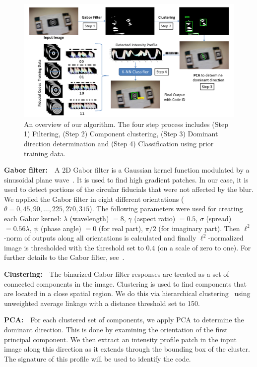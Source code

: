 \begin{figure}[ht!]
  \centering
  \includegraphics[width=0.8\linewidth]{figures/fiducial/overall_flow.pdf}
  \caption[Overall Workflow]{An overview of our algorithm.
    The four step process includes (Step 1) Filtering,
    (Step 2) Component clustering, (Step 3) Dominant direction determination
    and (Step 4) Classification using prior training data.}
  \label{fig:overall_flow}
\end{figure}

\textbf{Gabor filter:}~~A 2D Gabor filter is a Gaussian kernel function
modulated by a sinusoidal plane wave~\cite{Kruizinga:2002}. It is used to find
high gradient patches. In our case, it is used to detect portions
of the circular fiducials that were not affected by the blur.
We applied the Gabor filter in eight
different orientations ($\theta = 0, 45, 90, \ldots, 225, 270, 315$).  The
following parameters were used for creating each Gabor kernel: $\lambda$ (wavelength) $= 8$, $\gamma$
(aspect ratio) $= 0.5$, $\sigma$ (spread) $= 0.56\lambda$, $\psi$
(phase angle) $= 0$ (for real part), $\pi/2$ (for imaginary part).
Then $\ell^2$-norm of outputs along all orientations is calculated and finally
$\ell^2$-normalized image is thresholded with the threshold set to $0.4$ (on
a scale of zero to one).  For further details to the Gabor filter,
see~\cite{Kruizinga:2002}.

\textbf{Clustering:}~~The binarized Gabor filter responses are
treated as a set of connected components in the image.   Clustering
is used to find components that are located in a close spatial region.  We do
this via hierarchical clustering~\cite{ALGLIB} using unweighted
average linkage with a distance threshold set to 150.

\textbf{PCA:}~~For each clustered set of components, we apply
PCA to determine the dominant direction.  This is done by examining
the orientation of the first principal component.  We then extract an
intensity profile patch in the input image along this direction as it
extends through the bounding box of the cluster. The signature of this
profile will be used to identify the code.

